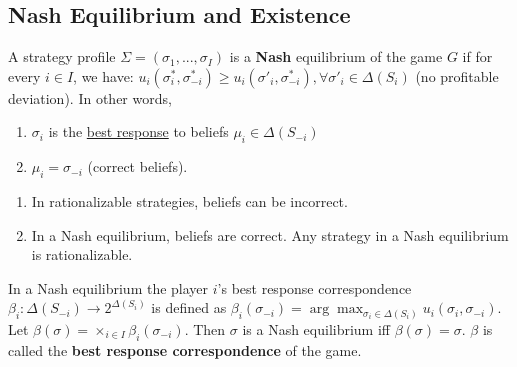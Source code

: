 \documentclass[11pt]{elegantbook}
\begin{document}
\subsection{Nash Equilibrium and Existence}
\begin{definition}
    \normalfont
    A strategy profile $\Sigma=(\sigma_1,...,\sigma_I)$ is a \textbf{Nash} equilibrium of the game $G$ if for every $i\in I$, we have: $u_i(\sigma^*_i,\sigma^*_{-i})\geq u_i(\sigma'_i,\sigma^*_{-i}), \forall \sigma'_i\in \Delta(S_i)$ (no profitable deviation). In other words,
    \begin{enumerate}
        \item $\sigma_i$ is the \underline{best response} to beliefs $\mu_i\in \Delta (S_{-i})$
        \item $\mu_i=\sigma_{-i}$ (correct beliefs).
    \end{enumerate}
\end{definition}
\begin{enumerate}
    \item In rationalizable strategies, beliefs can be incorrect.
    \item In a Nash equilibrium, beliefs are correct. Any strategy in a Nash equilibrium is rationalizable.
\end{enumerate}

\begin{definition}
    \normalfont
    In a Nash equilibrium the player $i$'s best response correspondence $\beta_i:\Delta(S_{-i})\rightarrow 2^{\Delta(S_i)}$ is defined as $\beta_i(\sigma_{-i})=\arg\max_{\sigma_i\in\Delta(S_i)}u_i(\sigma_i,\sigma_{-i})$. Let $\beta(\sigma)=\times_{i\in I}\beta_i(\sigma_{-i})$. Then $\sigma$ is a Nash equilibrium iff $\beta(\sigma)=\sigma$. $\beta$ is called the \textbf{best response correspondence} of the game.
\end{definition}
\end{document}
